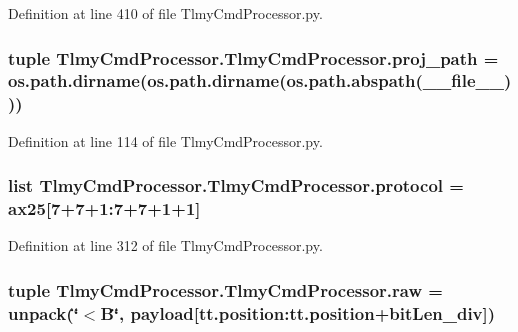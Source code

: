 Definition at line 410 of file Tlmy\+Cmd\+Processor.\+py.

\hypertarget{namespace_tlmy_cmd_processor_1_1_tlmy_cmd_processor_af01cc83846e14e401a5a2fbaec2fe940}{}
\subsubsection[{proj\+\_\+path}]{\setlength{\rightskip}{0pt plus 5cm}tuple Tlmy\+Cmd\+Processor.\+Tlmy\+Cmd\+Processor.\+proj\+\_\+path = os.\+path.\+dirname(os.\+path.\+dirname(os.\+path.\+abspath(\+\_\+\+\_\+file\+\_\+\+\_\+)))}\label{namespace_tlmy_cmd_processor_1_1_tlmy_cmd_processor_af01cc83846e14e401a5a2fbaec2fe940}


Definition at line 114 of file Tlmy\+Cmd\+Processor.\+py.

\hypertarget{namespace_tlmy_cmd_processor_1_1_tlmy_cmd_processor_a17d264f6dce0704d10c660e63fb9d6e6}{}
\subsubsection[{protocol}]{\setlength{\rightskip}{0pt plus 5cm}list Tlmy\+Cmd\+Processor.\+Tlmy\+Cmd\+Processor.\+protocol = {\bf ax25}\mbox{[}7+7+1\+:7+7+1+1\mbox{]}}\label{namespace_tlmy_cmd_processor_1_1_tlmy_cmd_processor_a17d264f6dce0704d10c660e63fb9d6e6}


Definition at line 312 of file Tlmy\+Cmd\+Processor.\+py.

\hypertarget{namespace_tlmy_cmd_processor_1_1_tlmy_cmd_processor_ac2be67bdf9c4739fcb093941b2bc851a}{}
\subsubsection[{raw}]{\setlength{\rightskip}{0pt plus 5cm}tuple Tlmy\+Cmd\+Processor.\+Tlmy\+Cmd\+Processor.\+raw = unpack(\char`\"{}$<$B\char`\"{}, payload\mbox{[}tt.\+position\+:tt.\+position+{\bf bit\+Len\+\_\+div}\mbox{]})}\label{namespace_tlmy_cmd_processor_1_1_tlmy_cmd_processor_ac2be67bdf9c4739fcb093941b2bc851a}


